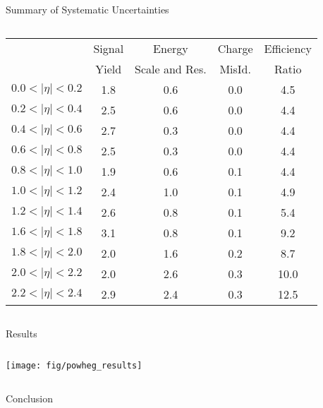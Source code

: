 \documentclass[t, 8pt]{beamer}
\begin{document}
\begin{frame}{Summary of Systematic Uncertainties}
  \begin{columns}[c]
  \tiny{
 \begin{center}
   \begin{tabular}{l|cccc}
      \hline\hline
      &Signal & Energy & Charge &  Efficiency \\
     & Yield & Scale and Res. & MisId. & Ratio \\ \hline
      $0.0<|\eta|<0.2$ & 1.8 & 0.6 & 0.0 &  4.5 \\
      $0.2<|\eta|<0.4$ & 2.5 & 0.6 & 0.0 &  4.4 \\
      $0.4<|\eta|<0.6$ & 2.7 & 0.3 & 0.0 &  4.4 \\
      $0.6<|\eta|<0.8$ & 2.5 & 0.3 & 0.0 &  4.4 \\
      $0.8<|\eta|<1.0$ & 1.9 & 0.6 & 0.1 &  4.4 \\
      $1.0<|\eta|<1.2$ & 2.4 & 1.0 & 0.1 &  4.9 \\
      $1.2<|\eta|<1.4$ & 2.6 & 0.8 & 0.1 &  5.4 \\
      $1.6<|\eta|<1.8$ & 3.1 & 0.8 & 0.1 &  9.2 \\
      $1.8<|\eta|<2.0$ & 2.0 & 1.6 & 0.2 &  8.7 \\
      $2.0<|\eta|<2.2$ & 2.0 & 2.6 & 0.3 & 10.0 \\
      $2.2<|\eta|<2.4$ & 2.9 & 2.4 & 0.3 & 12.5 \\
    \end{tabular}
  \end{center} 
  }

  \end{columns}

\end{frame}

\begin{frame}{Results}
\begin{columns}[c]


    \texttt{[image: fig/powheg\_results]}
  \end{columns}
\end{frame}

\begin{frame}{Conclusion}
  \begin{columns}[c]
  \end{columns}
\end{frame}
\end{document}
